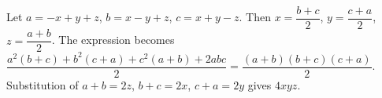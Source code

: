 Let $a=-x+y+z$, $b=x-y+z$, $c=x+y-z$. Then $x=\dfrac{b+c}{2}$, $y=\dfrac{c+a}{2}$, $z=\dfrac{a+b}{2}$. The expression becomes $\dfrac{a^2(b+c)+b^2(c+a)+c^2(a+b)+2abc}{2}=\dfrac{(a+b)(b+c)(c+a)}{2}$. Substitution of $a+b=2z$, $b+c=2x$, $c+a=2y$ gives $\boxed{4xyz}$.
